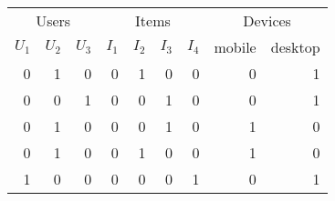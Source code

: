 \begin{tabular}{rrr|rrrr|rr}
\toprule
\multicolumn{3}{c}{Users} & \multicolumn{4}{c}{Items} & \multicolumn{2}{c}{Devices}\\
\cmidrule{1-3} \cmidrule{4-6} \cmidrule{7-9}
 $U_1$ &  $U_2$ &  $U_3$ &  $I_1$ &  $I_2$ &  $I_3$ &  $I_4$ &  mobile &  desktop \\
\midrule
 0 &  \alert1 &  0 &  0 &  \alert1 &  0 &  0 &  0 &  \alert1 \\
 0 &  0 &  \alert1 &  0 &  0 &  \alert1 &  0 &  0 &  \alert1 \\
 0 &  \alert1 &  0 &  0 &  0 &  \alert1 &  0 &  \alert1 &  0 \\
 0 &  \alert1 &  0 &  0 &  \alert1 &  0 &  0 &  \alert1 &  0 \\
 \alert1 &  0 &  0 &  0 &  0 &  0 &  \alert1 &  0 &  \alert1 \\
\bottomrule
\end{tabular}
